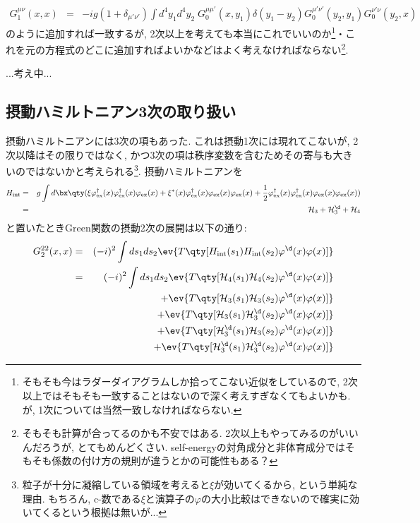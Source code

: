 \documentclass[10.5pt,a4paper]{jreport}
\begin{document}
\begin{eqnarray}
  G^{\mu\nu}_1(x, x) &=& -ig(1+\delta_{\mu'\nu'})\int d^4y_1d^4y_2\;G_0^{\mu\mu'}(x, y_1)\delta(y_1 - y_2)G_0^{\mu'\nu'}(y_2, y_1)G_0^{\nu'\nu}(y_2, x)
\end{eqnarray}
のように追加すれば一致するが, 2次以上を考えても本当にこれでいいのか\footnote{そもそも今はラダーダイアグラムしか拾ってこない近似をしているので, 2次以上ではそもそも一致することはないので深く考えすぎなくてもよいかも. が, 1次については当然一致しなければならない. }・これを元の方程式のどこに追加すればよいかなどはよく考えなければならない\footnote{そもそも計算が合ってるのかも不安ではある. 2次以上もやってみるのがいいんだろうが, とてもめんどくさい. self-energyの対角成分と非体育成分ではそもそも係数の付け方の規則が違うとかの可能性もある？}.

...考え中...
\subsection{摂動ハミルトニアン3次の取り扱い}
摂動ハミルトニアンには3次の項もあった. これは摂動1次には現れてこないが, 2次以降はその限りではなく, かつ3次の項は秩序変数を含むためその寄与も大きいのではないかと考えられる\footnote{粒子が十分に凝縮している領域を考えると$\xi$が効いてくるから, という単純な理由. もちろん, c-数である$\xi$と演算子の$\varphi$の大小比較はできないので確実に効いてくるという根拠は無いが...}. 摂動ハミルトニアンを
\begin{eqnarray}
\nonumber  H_{\rm int} &=& g\int d\bx \qty(\xi \varphi_{\rm ex}^\dagger(x)\varphi_{\rm ex}^\dagger(x)\varphi_{\rm ex}(x) + \xi^*(x)\varphi_{\rm ex}^\dagger(x)\varphi_{\rm ex}(x)\varphi_{\rm ex}(x) + \frac12\varphi_{\rm ex}^\dagger(x)\varphi_{\rm ex}^\dagger(x)\varphi_{\rm ex}(x)\varphi_{\rm ex}(x))\\
  &=& {\cal H}_3 + {\cal H}_3^\d + {\cal H}_4
\end{eqnarray}
と置いたときGreen関数の摂動2次の展開は以下の通り:
\begin{eqnarray}
\nonumber  G_2^{22}(x, x) &=& (-i)^2\int ds_1ds_2\ev{T\qty[H_{\rm int}(s_1)H_{\rm int}(s_2)\varphi^\d(x)\varphi(x)]}\\
&=& (-i)^2\int ds_1ds_2\ev{T\qty[{\cal H}_4(s_1){\cal H}_4(s_2)\varphi^\d(x)\varphi(x)]}\\
&&\hspace{2.0cm} + \ev{T\qty[{\cal H}_3(s_1){\cal H}_3(s_2)\varphi^\d(x)\varphi(x)]}\label{2nd-Green-first}\\
&&\hspace{2.0cm} + \ev{T\qty[{\cal H}_3(s_1){\cal H}^\d_3(s_2)\varphi^\d(x)\varphi(x)]}\\
&&\hspace{2.0cm} + \ev{T\qty[{\cal H}^\d_3(s_1){\cal H}_3(s_2)\varphi^\d(x)\varphi(x)]}\\
&&\hspace{2.0cm} + \ev{T\qty[{\cal H}^\d_3(s_1){\cal H}^\d_3(s_2)\varphi^\d(x)\varphi(x)]}\label{2nd-Green-final}
\end{eqnarray}
\end{document}
